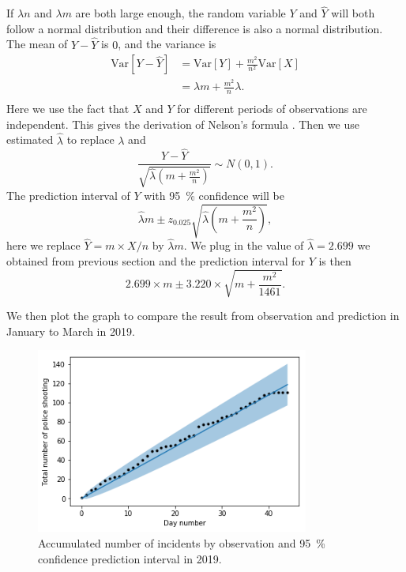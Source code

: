 \documentclass[11pt,a4paper,english]{article}
\begin{document}
If $\lambda n$ and $\lambda m$ are both large enough, the random variable $Y$ and $\hat{Y}$ will both follow a normal distribution and their difference is also a normal distribution.
The mean of $Y-\hat{Y}$ is $0$, and the variance is
\begin{align*}
	\text{Var}[Y-\hat{Y}] &= \text{Var}[Y]+\frac{m^{2}}{n^{2}}\text{Var}[X]\\
	&= \lambda m+\frac{m^{2}}{n}\lambda.\\
\end{align*}
Here we use the fact that $X$ and $Y$ for different periods of observations are independent.
This gives the derivation of Nelson's formula \cite{prediction}.
Then we use estimated $\hat{\lambda}$ to replace $\lambda$ and 
\begin{equation*}
	\frac{Y-\hat{Y}}{\sqrt{\hat{\lambda}\left(m+\frac{m^{2}}{n}\right)}} \sim N(0,1).
\end{equation*}
The prediction interval of $Y$ with \SI{95}{\percent} confidence will be 
\begin{equation*}
	\hat{\lambda}m \pm z_{0.025}\sqrt{\hat{\lambda}\left(m+\frac{m^{2}}{n}\right)},
\end{equation*}
here we replace $\hat{Y} = m \times X/n$ by $\hat{\lambda}m$. We plug in the value of $\hat{\lambda} = 2.699$ we obtained from previous section and the prediction interval for $Y$ is then 
\begin{equation*}
	2.699 \times m \pm 3.220 \times \sqrt{m+\frac{m^{2}}{1461}}.
\end{equation*} 

We then plot the graph to compare the result from observation and prediction in January to March in 2019.
\begin{figure}[htbp]
	\centering
	\includegraphics[width=0.8\textwidth]{predict}
	\caption{Accumulated number of incidents by observation and \SI{95}{\percent} confidence prediction interval in 2019.}
	\label{fig:predict}
\end{figure}
\end{document}

